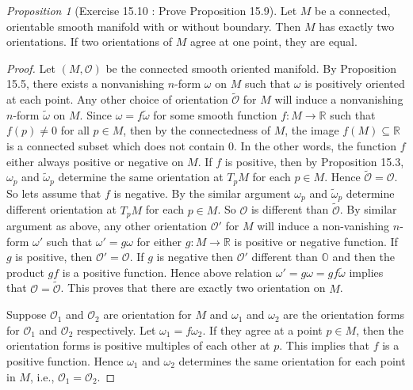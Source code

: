 \documentclass[a4paper]{article}
\theoremstyle{remark}
\newtheorem{prop}{Proposition}
\newcommand{\er}{\mathbb{R}} %
\newcommand{\subhim}{\subseteq} %
\newcommand\wtilde[1]{\widetilde{#1}} %
\begin{document}
\begin{prop}[Exercise 15.10 : Prove Proposition 15.9]
Let $M$ be a connected, orientable smooth manifold with or without boundary. Then $M$ has exactly two orientations. If two orientations of $M$ agree at one point, they are equal.
\end{prop}
\begin{proof}
Let $(M,\mathcal{O})$ be the connected smooth oriented manifold. By Proposition 15.5, there exists a nonvanishing $n$-form $\omega$ on $M$ such that $\omega$ is positively oriented at each point. Any other choice of orientation $\wtilde{\mathcal{O}}$ for $M$ will induce a nonvanishing $n$-form $\wtilde{\omega}$ on $M$. Since $\omega = f \wtilde{\omega}$ for some smooth function $f : M \to \er$ such that $f(p) \neq 0$ for all $p \in M$, then by the connectedness of $M$, the image $f(M) \subhim \er$ is a connected subset which does not contain $0$. In the other words, the function $f$ either always positive or negative on $M$. If $f$ is positive, then by Proposition 15.3, $\omega_p$ and $\wtilde{\omega}_p$ determine the same orientation at $T_pM$ for each $p \in M$. Hence $\wtilde{\mathcal{O}} = \mathcal{O}$. So lets assume that $f$ is negative. By the similar argument $\omega_p$ and $\wtilde{\omega}_p$ determine different orientation at $T_pM$  for each $p \in M$. So $\mathcal{O}$ is different than $\wtilde{\mathcal{O}}$. By similar argument as above, any other orientation $\mathcal{O}'$ for $M$ will induce a non-vanishing $n$-form $\omega'$ such that $\omega' = g \omega$ for either $g : M \to \er$ is positive or negative function. If $g$ is positive, then $\mathcal{O}' = \mathcal{O}$. If $g$ is negative then $\mathcal{O}'$ different than $\mathbb{O}$ and then the product $gf$ is a positive function. Hence above relation $\omega' =g \omega= gf \wtilde{\omega}$ implies that $\mathcal{O} = \wtilde{\mathcal{O}}$. This proves that there are exactly two orientation on $M$. 

Suppose $\mathcal{O}_1$ and $\mathcal{O}_2$ are orientation for $M$ and $\omega_1$ and $\omega_2$ are the orientation forms for $\mathcal{O}_1$ and $\mathcal{O}_2$ respectively. Let $\omega_1 = f \omega_2$. If they agree at a point $p \in M$, then the orientation forms is positive multiples of each other at $p$. This implies that $f$ is a positive function. Hence $\omega_1$ and $\omega_2$ determines the same orientation for each point in $M$, i.e., $\mathcal{O}_1 = \mathcal{O}_2$.  
\end{proof}
\end{document}
